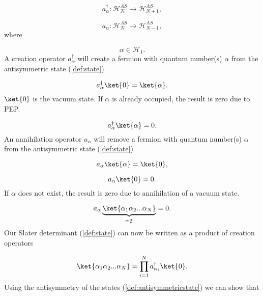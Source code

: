 \begin{equation}
a_{\alpha}^{\dagger}: \mathcal{H}_{N}^{AS} \rightarrow \mathcal{H}_{N+1}^{AS},
 \label{def:creation}
\end{equation}

\begin{equation}
a_{\alpha}: \mathcal{H}_N^{AS} \rightarrow \mathcal{H}_{N-1}^{AS},
 \label{def:annihilation}
\end{equation}
%
where 

\begin{equation}
 \alpha \in \mathcal{H}_1.
\end{equation}
%
A creation operator $a_{\alpha}^{\dagger}$ will create a fermion with quantum number(s) $\alpha$ from the antisymmetric state (\ref{def:state})
 

\begin{equation}
a_{\alpha}^{\dagger} \ket{0} = \ket{\alpha}.
 \label{ex:creation}
\end{equation}
%
$\ket{0}$ is the vacuum state. If $\alpha$ is already occupied, the result is zero due to PEP. 

\begin{equation}
a_{\alpha}^{\dagger} \ket{\alpha} = 0.
 \label{ex:creationpep}
\end{equation}
%
An annihilation operator $a_{\alpha}$ will remove a fermion with quantum number(s) $\alpha$ from the antisymmetric state (\ref{def:state})

\begin{equation}
a_{\alpha}\ket{\alpha} = \ket{0},
 \label{ex:annihilation}
\end{equation}

\begin{equation}
a_{\alpha}\ket{0} = 0.
 \label{ex:annihilationvacuum}
\end{equation}
%
If $\alpha$ does not exist, the result is zero due to annihilation of a vacuum state. 

\begin{equation}
a_{\alpha} \underbrace{\ket{\alpha_1\alpha_2...\alpha_N}}_{\alpha \notin} = 0.
 \label{ex:annihilationpep}
\end{equation}
%
Our Slater determinant (\ref{def:state}) can now be written as a product of creation operators

\begin{equation}
\ket{\alpha_1\alpha_2...\alpha_N} = \prod_{i=1}^N a_{\alpha_i}^\dagger \ket{0}.
 \label{eq:slatercreationproduct}
\end{equation}
%
Using the antisymmetry of the states (\ref{def:antisymmetricstate}) we can show that

